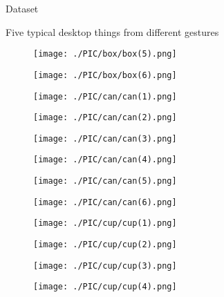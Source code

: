 \documentclass[xcolor=table,compress,blue]{beamer}
\begin{document}
\begin{frame}{Dataset}
\begin{exampleblock}{Five typical desktop things from different gestures}
\begin{figure}[htpb]
			\begin{minipage}[b]{0.65in}
				\centerline{ \texttt{[image: ./PIC/box/box(5).png]} }
			\end{minipage}
			\begin{minipage}[b]{0.65in}
				\centerline{ \texttt{[image: ./PIC/box/box(6).png]} }
			\end{minipage}
			\begin{minipage}[b]{0.65in}
				\centerline{ \texttt{[image: ./PIC/can/can(1).png]} }
			\end{minipage}
			\begin{minipage}[b]{0.65in}
				\centerline{ \texttt{[image: ./PIC/can/can(2).png]} }
			\end{minipage}
			\begin{minipage}[b]{0.65in}
				\centerline{ \texttt{[image: ./PIC/can/can(3).png]} }
			\end{minipage}
			\begin{minipage}[b]{0.65in}
				\centerline{ \texttt{[image: ./PIC/can/can(4).png]} }
			\end{minipage}
			\begin{minipage}[b]{0.65in}
				\centerline{ \texttt{[image: ./PIC/can/can(5).png]} }
			\end{minipage}
			\begin{minipage}[b]{0.65in}
				\centerline{ \texttt{[image: ./PIC/can/can(6).png]} }
			\end{minipage}
			\begin{minipage}[b]{0.65in}
				\centerline{ \texttt{[image: ./PIC/cup/cup(1).png]} }
			\end{minipage}
			\begin{minipage}[b]{0.65in}
				\centerline{ \texttt{[image: ./PIC/cup/cup(2).png]} }
			\end{minipage}
			\begin{minipage}[b]{0.65in}
				\centerline{ \texttt{[image: ./PIC/cup/cup(3).png]} }
			\end{minipage}
			\begin{minipage}[b]{0.65in}
				\centerline{ \texttt{[image: ./PIC/cup/cup(4).png]} }
			\end{minipage}
			\begin{minipage}[b]{0.65in}

\end{minipage}
\end{figure}
\end{exampleblock}
\end{frame}
\end{document}
